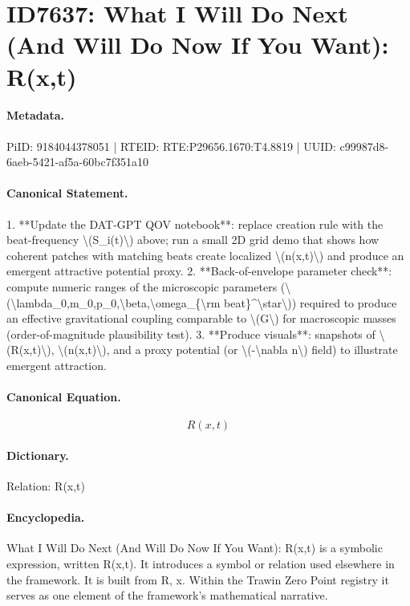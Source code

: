 \section*{ID7637: What I Will Do Next (And Will Do Now If You Want): R(x,t)}
\paragraph{Metadata.}
PiID: 9184044378051 | RTEID: RTE:P29656.1670:T4.8819 | UUID: c99987d8-6aeb-5421-af5a-60bc7f351a10

\paragraph{Canonical Statement.}
1. **Update the DAT-GPT QOV notebook**: replace creation rule with the beat-frequency \textbackslash{}(S\_i(t)\textbackslash{}) above; run a small 2D grid demo that shows how coherent patches with matching beats create localized \textbackslash{}(n(x,t)\textbackslash{}) and produce an emergent attractive potential proxy. 2. **Back-of-envelope parameter check**: compute numeric ranges of the microscopic parameters (\textbackslash{}(\textbackslash{}lambda\_0,m\_0,p\_0,\textbackslash{}beta,\textbackslash{}omega\_\{\textbackslash{}rm beat\}\textasciicircum{}\textbackslash{}star\textbackslash{})) required to produce an effective gravitational coupling comparable to \textbackslash{}(G\textbackslash{}) for macroscopic masses (order-of-magnitude plausibility test). 3. **Produce visuals**: snapshots of \textbackslash{}(R(x,t)\textbackslash{}), \textbackslash{}(n(x,t)\textbackslash{}), and a proxy potential (or \textbackslash{}(-\textbackslash{}nabla n\textbackslash{}) field) to illustrate emergent attraction.

\paragraph{Canonical Equation.}
\[
R(x,t)
\]

\paragraph{Dictionary.}
Relation: R(x,t)

\paragraph{Encyclopedia.}
What I Will Do Next (And Will Do Now If You Want): R(x,t) is a symbolic expression, written R(x,t). It introduces a symbol or relation used elsewhere in the framework. It is built from R, x. Within the Trawin Zero Point registry it serves as one element of the framework's mathematical narrative.
